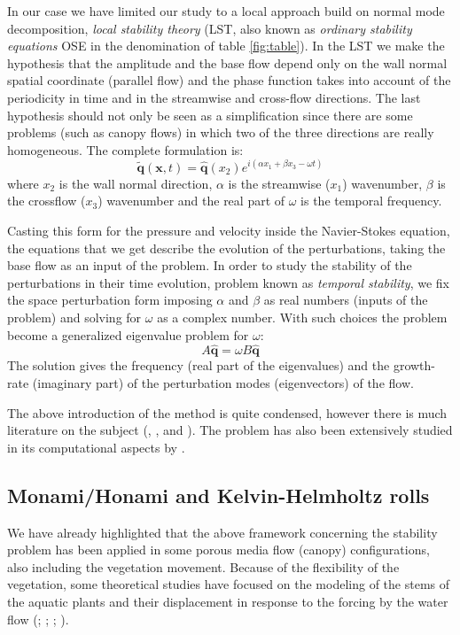 In our case we have limited our study to a local approach build on normal mode decomposition, \textit{local stability theory} (LST, also known as \textit{ordinary stability equations} OSE in the denomination of table \ref{fig:table}).
In the LST we make the hypothesis that the amplitude and the base flow depend only on the wall normal spatial coordinate (parallel flow) and the phase function takes into account of the periodicity in time and in the streamwise and cross-flow directions.
The last hypothesis should not only be seen as a simplification since there are some problems (such as canopy flows) in which two of the three directions are really homogeneous.
The complete formulation is:
 $$  \widetilde{\mathbf{q}}(\mathbf{x},t) =  \widehat{\mathbf{q}}(x_2) e^{i(\alpha x_1 + \beta x_3 - \omega t)}  $$ 
where $x_2$ is the wall normal direction, $\alpha$ is the streamwise ($x_1$) wavenumber, $\beta$ is the crossflow ($x_3$) wavenumber and the real part of $\omega$ is the temporal frequency.

Casting this form for the pressure and velocity inside the Navier-Stokes equation, the equations that we get describe the evolution of the perturbations, taking the base flow as an input of the problem.
In order to study the stability of the perturbations in their time evolution, problem known as \textit{temporal stability}, we fix the space perturbation form imposing $\alpha$ and $\beta$ as real numbers (inputs of the problem) and solving for $\omega$ as a complex number.
With such choices the problem become a generalized eigenvalue problem for $\omega$:
$$ A \widehat{\mathbf{q}} =  \omega B\widehat{\mathbf{q}} $$
The solution gives the frequency (real part of the eigenvalues) and the growth-rate (imaginary part) of the perturbation modes (eigenvectors) of the flow.

The above introduction of the method is quite condensed, however there is much literature on the subject (\citet{juniper2014modal}, \citet{criminale2003theory}, \citet{schmid2012stability} and \citet{ortiz2002spatial}). The problem has also been extensively studied in its computational aspects by \citet{canuto1988spectral}.

\subsection{Monami/Honami and Kelvin-Helmholtz rolls}

We have already highlighted that the above framework concerning the stability problem has been applied in some porous media flow (canopy) configurations, also including the vegetation movement.
Because of the flexibility of the vegetation, some theoretical studies have focused on the
modeling of the stems of the aquatic plants and their displacement in response to the forcing by the
water flow (\citet{py2004mixing}; \citet{patil2010characteristics}; \citet{gosselin2009destabilising}; \citet{py2006frequency}).

